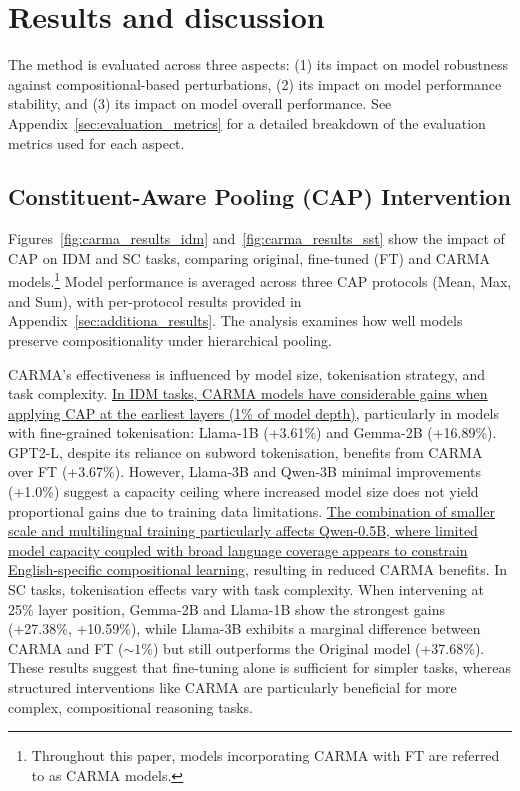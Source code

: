 \section{Results and discussion}\label{sec:results}
The method is evaluated across three aspects: (1) its impact on model robustness against compositional-based perturbations, (2) its impact on model performance stability, and (3) its impact on model overall performance. See Appendix~\ref{sec:evaluation_metrics} for a detailed breakdown of the evaluation metrics used for each aspect.

\subsection{Constituent-Aware Pooling (CAP) Intervention}
Figures~\ref{fig:carma_results_idm} and~\ref{fig:carma_results_sst} show the impact of CAP on IDM and SC tasks, comparing original, fine-tuned (FT) and CARMA models.\footnote{Throughout this paper, models incorporating CARMA with FT are referred to as CARMA models.} Model performance is averaged across three CAP protocols (Mean, Max, and Sum), with per-protocol results provided in Appendix~\ref{sec:additiona_results}. The analysis examines how well models preserve compositionality under hierarchical pooling.

CARMA's effectiveness is influenced by model size, tokenisation strategy, and task complexity. \ul{In IDM tasks, CARMA models have considerable gains when applying CAP at the earliest layers (1\% of model depth),} particularly in models with fine-grained tokenisation: Llama-1B (+3.61\%) and Gemma-2B (+16.89\%). GPT2-L, despite its reliance on subword tokenisation, benefits from CARMA over FT (+3.67\%). However, Llama-3B and Qwen-3B minimal improvements (+1.0\%) suggest a capacity ceiling where increased model size does not yield proportional gains due to training data limitations. \ul{The combination of smaller scale and multilingual training particularly affects Qwen-0.5B, where limited model capacity coupled with broad language coverage appears to constrain English-specific compositional learning,} resulting in reduced CARMA benefits. In SC tasks, tokenisation effects vary with task complexity. When intervening at 25\% layer position, Gemma-2B and Llama-1B show the strongest gains (+27.38\%, +10.59\%), while Llama-3B exhibits a marginal difference between CARMA and FT ($\sim1\%$) but still outperforms the Original model (+37.68\%). These results suggest that fine-tuning alone is sufficient for simpler tasks, whereas structured interventions like CARMA are particularly beneficial for more complex, compositional reasoning tasks.


